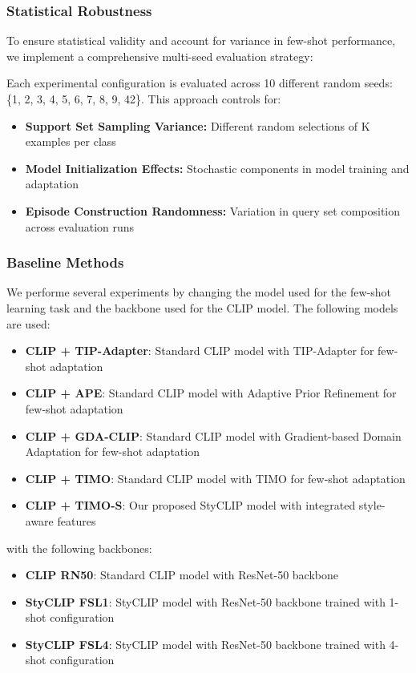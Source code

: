\documentclass[conference,6pt]{IEEEtran}
\begin{document}
\subsubsection{Statistical Robustness}

To ensure statistical validity and account for variance in few-shot performance, we implement a comprehensive multi-seed evaluation strategy:

Each experimental configuration is evaluated across 10 different random seeds: \{1, 2, 3, 4, 5, 6, 7, 8, 9, 42\}. This approach controls for:
\begin{itemize}
    \item \textbf{Support Set Sampling Variance:} Different random selections of K examples per class
    \item \textbf{Model Initialization Effects:} Stochastic components in model training and adaptation
    \item \textbf{Episode Construction Randomness:} Variation in query set composition across evaluation runs
\end{itemize}

\subsubsection{Baseline Methods}

We performe several experiments by changing the model used for the few-shot learning task and the backbone used for the CLIP model. The following models are used:
\begin{itemize}
    \item \textbf{CLIP + TIP-Adapter}: Standard CLIP model with TIP-Adapter \cite{TipAdapter} for few-shot adaptation
    \item \textbf{CLIP + APE}: Standard CLIP model with Adaptive Prior Refinement \cite{APE} for few-shot adaptation
    \item \textbf{CLIP + GDA-CLIP}: Standard CLIP model with Gradient-based Domain Adaptation \cite{GDA_CLIP} for few-shot adaptation
    \item \textbf{CLIP + TIMO}: Standard CLIP model with TIMO \cite{TIMO} for few-shot adaptation
    \item \textbf{CLIP + TIMO-S}: Our proposed StyCLIP model with integrated style-aware features
\end{itemize}

with the following backbones:
\begin{itemize}
    \item \textbf{CLIP RN50}: Standard CLIP model with ResNet-50 backbone
    \item \textbf{StyCLIP FSL1}: StyCLIP model with ResNet-50 backbone trained with 1-shot configuration
    \item \textbf{StyCLIP FSL4}: StyCLIP model with ResNet-50 backbone trained with 4-shot configuration
\end{itemize}
\end{document}
